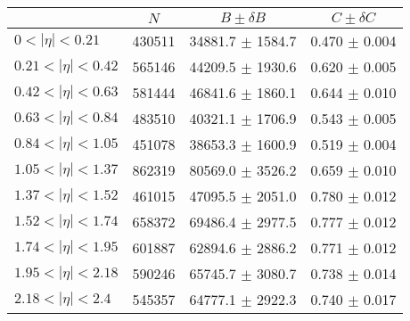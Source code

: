 \begin{tabular}{lccc}
\hline
    &   $N$   & $B \pm \delta B$  &  $C \pm \delta C$ \\
\hline
$0 < |\eta| <0.21$             & 430511     & 34881.7    $\pm$ 1584.7 & 0.470      $\pm$ 0.004 \\
$0.21 < |\eta| <0.42$          & 565146     & 44209.5    $\pm$ 1930.6 & 0.620      $\pm$ 0.005 \\
$0.42 < |\eta| <0.63$          & 581444     & 46841.6    $\pm$ 1860.1 & 0.644      $\pm$ 0.010 \\
$0.63 < |\eta| <0.84$          & 483510     & 40321.1    $\pm$ 1706.9 & 0.543      $\pm$ 0.005 \\
$0.84 < |\eta| <1.05$          & 451078     & 38653.3    $\pm$ 1600.9 & 0.519      $\pm$ 0.004 \\
$1.05 < |\eta| <1.37$          & 862319     & 80569.0    $\pm$ 3526.2 & 0.659      $\pm$ 0.010 \\
$1.37 < |\eta| <1.52$          & 461015     & 47095.5    $\pm$ 2051.0 & 0.780      $\pm$ 0.012 \\
$1.52 < |\eta| <1.74$          & 658372     & 69486.4    $\pm$ 2977.5 & 0.777      $\pm$ 0.012 \\
$1.74 < |\eta| <1.95$          & 601887     & 62894.6    $\pm$ 2886.2 & 0.771      $\pm$ 0.012 \\
$1.95 < |\eta| <2.18$          & 590246     & 65745.7    $\pm$ 3080.7 & 0.738      $\pm$ 0.014 \\
$2.18 < |\eta| <2.4$           & 545357     & 64777.1    $\pm$ 2922.3 & 0.740      $\pm$ 0.017 \\
\hline
\end{tabular}

